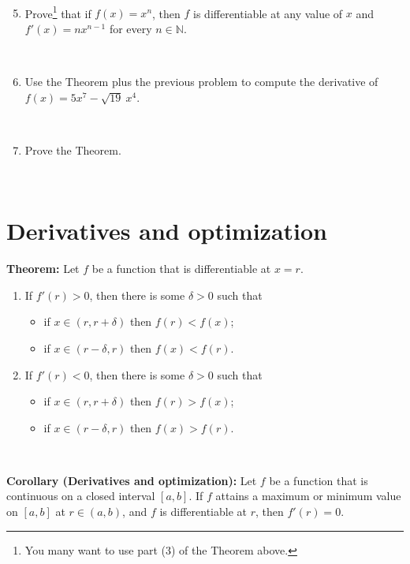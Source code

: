 \documentclass[12pt]{amsart}
\newcommand{\N}{\mathbb{N}}
\begin{document}
 \
 
 \begin{enumerate}\setcounter{enumi}{4}
 \item Prove\footnote{You many want to use part (3) of the Theorem above.} that if $f(x)=x^n$, then $f$ is differentiable at any value of $x$ and $f'(x) = n x^{n-1}$ for every $n\in \N$.
 
 \
 
 \item Use the Theorem plus the previous problem to compute the derivative of $f(x) = 5x^7 - \sqrt{19} \ x^4$.
 
 \
 
 \item Prove the Theorem.
 
 \
 
 \end{enumerate}
 
 \newpage
 
	\section*{Derivatives and optimization}


 
 \begin{framed} 
 \noindent \textbf{Theorem:} Let $f$ be a function that is differentiable at $x=r$.
 \begin{enumerate}
 \item 
 If $f'(r) > 0$, then there is some $\delta>0$ such that 
 \begin{itemize}
 \item if $x\in (r,r+\delta)$ then $f(r) < f(x)$;
  \item if $x\in (r-\delta,r)$ then $f(x) < f(r)$.
  \end{itemize}
  
  \item  If $f'(r) < 0$, then there is some $\delta>0$ such that 
  \begin{itemize}
 \item if $x\in (r,r+\delta)$ then $f(r) > f(x)$;
 \item if $x\in (r-\delta,r)$ then $f(x) > f(r)$.
  \end{itemize}
  \end{enumerate}
  
  \
  
  \noindent \textbf{Corollary (Derivatives and optimization):}
  Let $f$ be a function that is continuous on a closed interval $[a,b]$. If $f$ attains a maximum or minimum value on $[a,b]$ at $r\in (a,b)$, and $f$ is differentiable at $r$, then $f'(r)=0$.
  
 \end{framed}
 
\end{document}
